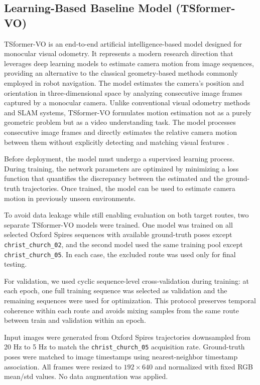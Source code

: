\documentclass[pdflatex,sn-mathphys-num]{sn-jnl}
\theoremstyle{thmstyleone}%
\theoremstyle{thmstyletwo}%
\theoremstyle{thmstylethree}%
\begin{document}
\subsection{Learning-Based Baseline Model (TSformer-VO)}

TSformer-VO is an end-to-end artificial intelligence-based model designed for monocular visual odometry. It represents a modern research direction that leverages deep learning models to estimate camera motion from image sequences, providing an alternative to the classical geometry-based methods commonly employed in robot navigation. The model estimates the camera's position and orientation in three-dimensional space by analyzing consecutive image frames captured by a monocular camera. Unlike conventional visual odometry methods and SLAM systems, TSformer-VO formulates motion estimation not as a purely geometric problem but as a video understanding task. The model processes consecutive image frames and directly estimates the relative camera motion between them without explicitly detecting and matching visual features \cite{franccani2025transformer}.

Before deployment, the model must undergo a supervised learning process. During training, the network parameters are optimized by minimizing a loss function that quantifies the discrepancy between the estimated and the ground-truth trajectories. Once trained, the model can be used to estimate camera motion in previously unseen environments.

To avoid data leakage while still enabling evaluation on both target routes, two separate TSformer-VO models were trained. One model was trained on all selected Oxford Spires sequences with available ground-truth poses except \texttt{christ\_church\_02}, and the second model used the same training pool except \texttt{christ\_church\_05}. In each case, the excluded route was used only for final testing.

For validation, we used cyclic sequence-level cross-validation during training: at each epoch, one full training sequence was selected as validation and the remaining sequences were used for optimization. This protocol preserves temporal coherence within each route and avoids mixing samples from the same route between train and validation within an epoch.

Input images were generated from Oxford Spires trajectories downsampled from 20 Hz to 5 Hz to match the \texttt{christ\_church\_05} acquisition rate. Ground-truth poses were matched to image timestamps using nearest-neighbor timestamp association. All frames were resized to $192\times640$ and normalized with fixed RGB mean/std values. No data augmentation was applied.
\end{document}

